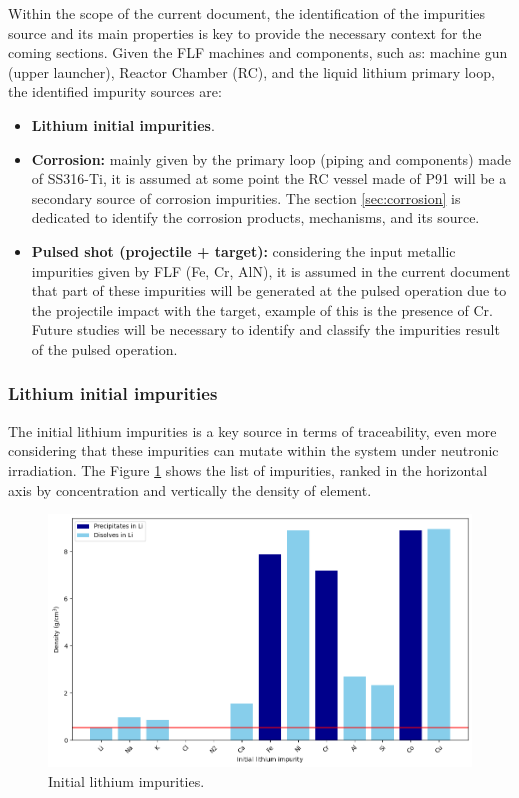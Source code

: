 Within the scope of the current document, the identification of the impurities source and its main properties is key to provide the necessary context for the coming sections. Given the FLF machines and components, such as: machine gun (upper launcher), Reactor Chamber (RC), and the liquid lithium primary loop, the identified impurity sources are:

\begin{itemize}
	\item \textbf{Lithium initial impurities}.
	\item \textbf{Corrosion:} mainly given by the primary loop (piping and components) made of SS316-Ti, it is assumed at some point the RC vessel made of P91 will be a secondary source of corrosion impurities. The section \ref{sec:corrosion} is dedicated to identify the corrosion products, mechanisms, and its source.
	\item \textbf{Pulsed shot (projectile + target):} considering the input metallic impurities given by FLF (Fe, Cr, AlN), it is assumed in the current document that part of these impurities will be generated at the pulsed operation due to the projectile impact with the target, example of this is the presence of Cr. Future studies will be necessary to identify and classify the impurities result of the pulsed operation. 
\end{itemize}

\subsubsection{Lithium initial impurities}

The initial lithium impurities is a key source in terms of traceability, even more  considering that these impurities can mutate within the system under neutronic irradiation. The Figure \ref{Li_init_imp_chart} shows the list of impurities, ranked in the horizontal axis by concentration and vertically the density of element.  

\begin{figure}[H]
	\centering
	\includegraphics[width=0.97\linewidth]{Li_init_imp_chart.png}
	\captionsetup{font=bf, size=small}
	\caption{Initial lithium impurities.}
	\label{Li_init_imp_chart}
\end{figure}



